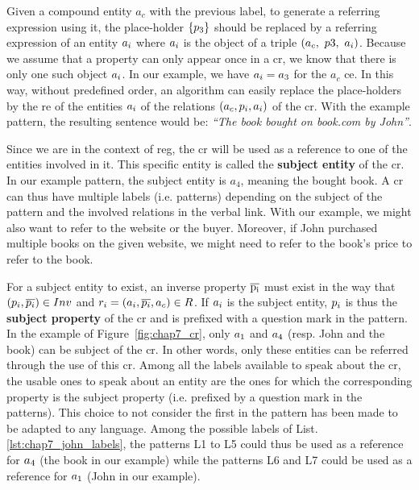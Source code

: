 Given a compound entity $a_c$ with the previous label, to generate a referring expression using it, the place-holder $\{p_3\}$ should be replaced by a referring expression of an entity $a_i$ where $a_i$ is the object of a triple $(a_c,\ p3,\ a_i)$. Because we assume that a property can only appear once in a \acrshort{cr}, we know that there is only one such object $a_i$. In our example, we have $a_i = a_3$ for the $a_c$ \acrshort{ce}.
In this way, without predefined order, an algorithm can easily replace the place-holders by the \acrshort{re} of the entities $a_i$ of the relations $(a_c, p_i, a_i)$ of the \acrshort{cr}. With the example pattern, the resulting sentence would be: \textit{``The book bought on book.com by John''}.

Since we are in the context of \acrshort{reg}, the \acrshort{cr} will be used as a reference to one of the entities involved in it. This specific entity is called the \textbf{subject entity} of the \acrshort{cr}. In our example pattern, the subject entity is $a_4$, meaning the bought book. A \acrshort{cr} can thus have multiple labels (i.e. patterns) depending on the subject of the pattern and the involved relations in the verbal link. With our example, we might also want to refer to the website or the buyer. Moreover, if John purchased multiple books on the given website, we might need to refer to the book's price to refer to the book.

For a subject entity to exist, an inverse property $\overline{\rm p_i}$ must exist in the way that $(p_i, \overline{p_i}) \in Inv$ and $r_i = (a_i, \overline{p_i}, a_c) \in R$. If $a_i$ is the subject entity, $p_i$ is thus the \textbf{subject property} of the \acrshort{cr} and is prefixed with a question mark in the pattern. In the example of Figure~\ref{fig:chap7_cr}, only $a_1$ and $a_4$ (resp. John and the book) can be subject of the \acrshort{cr}. In other words, only these entities can be referred through the use of this \acrshort{cr}. Among all the labels available to speak about the \acrshort{cr}, the usable ones to speak about an entity are the ones for which the corresponding property is the subject property (i.e. prefixed by a question mark in the patterns). This choice to not consider the first in the pattern has been made to be adapted to any language. Among the possible labels of List.\ref{lst:chap7_john_labels}, the patterns L1 to L5 could thus be used as a reference for $a_4$ (the book in our example) while the patterns L6 and L7 could be used as a reference for $a_1$ (John in our example).

